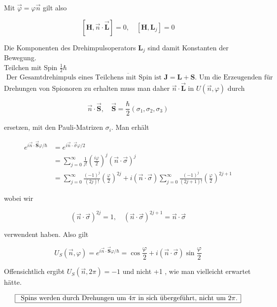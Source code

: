 \documentclass[10pt, letterpaper]{article}
\begin{document}
Mit $\vec{\varphi}=\varphi \vec{n}$ gilt also

$$
[\mathbf{H}, \vec{n} \cdot \overrightarrow{\mathbf{L}}]=0, \quad\left[\mathbf{H}, \mathbf{L}_{j}\right]=0
$$

Die Komponenten des Drehimpulsoperators $\mathbf{L}_{j}$ sind damit Konstanten der Bewegung.\\
Teilchen mit Spin $\frac{1}{2} \hbar$\\
$\overline{\text { Der Gesamtdrehimpuls eines Teilchens mit Spin ist } \mathbf{J}=\mathbf{L}+\mathbf{S} \text {. Um die Erzeugenden für }}$ Drehungen von Spionoren zu erhalten muss man daher $\vec{n} \cdot \overrightarrow{\mathbf{L}}$ in $U(\vec{n}, \varphi)$ durch

$$
\vec{n} \cdot \overrightarrow{\mathbf{S}}, \quad \overrightarrow{\mathbf{S}}=\frac{\hbar}{2}\left(\sigma_{1}, \sigma_{2}, \sigma_{3}\right)
$$

ersetzen, mit den Pauli-Matrizen $\sigma_{i}$. Man erhält

$$
\begin{aligned}
e^{i \vec{n} \cdot \overrightarrow{\mathbf{S}} \varphi / \hbar} & =e^{i \vec{n} \cdot \vec{\sigma} \varphi / 2} \\
& =\sum_{j=0}^{\infty} \frac{1}{j!}\left(\frac{i \varphi}{2}\right)^{j}(\vec{n} \cdot \vec{\sigma})^{j} \\
& =\sum_{j=0}^{\infty} \frac{(-1)^{j}}{(2 j)!}\left(\frac{\varphi}{2}\right)^{2 j}+i(\vec{n} \cdot \vec{\sigma}) \sum_{j=0}^{\infty} \frac{(-1)^{j}}{(2 j+1)!}\left(\frac{\varphi}{2}\right)^{2 j+1}
\end{aligned}
$$

wobei wir

$$
(\vec{n} \cdot \vec{\sigma})^{2 j}=1, \quad(\vec{n} \cdot \vec{\sigma})^{2 j+1}=\vec{n} \cdot \vec{\sigma}
$$

verwendent haben. Also gilt

$$
U_{S}(\vec{n}, \varphi)=e^{i \vec{n} \cdot \overrightarrow{\mathbf{S}} \varphi / \hbar}=\cos \frac{\varphi}{2}+i(\vec{n} \cdot \vec{\sigma}) \sin \frac{\varphi}{2}
$$

Offensichtlich ergibt $U_{S}(\vec{n}, 2 \pi)=-1$ und nicht +1 , wie man vielleicht erwartet hätte.

$$
\begin{array}{|l|}
\hline \text { Spins werden durch Drehungen um } 4 \pi \text { in sich übergeführt, nicht um } 2 \pi . \\
\hline
\end{array}
$$
\end{document}
